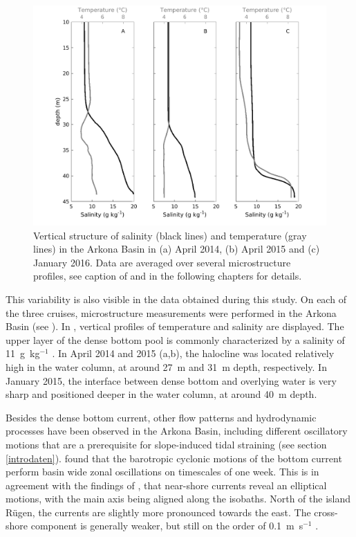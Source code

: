 \begin{figure}[ht]
\includegraphics[width=40pc]{bilder/arkona_TS.png}
 \caption{Vertical structure of salinity (black lines) and temperature (gray 
lines) in the Arkona Basin in (a) April 2014, (b) April 2015 and (c) January 
2016. Data are averaged over several microstructure profiles, see caption of 
 and  in the following chapters for details.}
 \label{TSarkona}
 \end{figure}
 
 This variability is also visible in the data obtained during this study. On 
each of the three cruises, microstructure measurements were performed in the 
Arkona Basin (see ). In , vertical profiles of 
temperature and salinity are displayed. The upper layer of the dense bottom pool 
is commonly characterized by a salinity of 11~g~kg$^{-1}$ \citep[][]{lass2005}. 
In April 2014 and 2015 (a,b), the halocline was located 
relatively high in the water column, at around 27~m and 31~m depth, 
respectively. In January 2015, the interface between dense bottom and overlying 
water is very sharp and positioned deeper in the water column, at around 40~m 
depth. 

Besides the dense bottom current, other flow patterns and hydrodynamic 
processes have been observed in the Arkona Basin, including different 
oscillatory motions that are a prerequisite for slope-induced tidal 
straining (see section \ref{introdaten}). \cite{lass2003} found that the 
barotropic cyclonic motions of the bottom current perform basin wide zonal 
oscillations on timescales of one week. This is in agreement with the findings 
of \cite{lass2001}, that near-shore currents reveal an elliptical motions, with 
the main axis being aligned along the isobaths. North of the island 
R\"{u}gen, the currents are slightly more pronounced towards the east. The 
cross-shore component is generally weaker, but still on the order of 
0.1~m~s$^{-1}$ \citep[][]{lass1993, lass2001}. 

